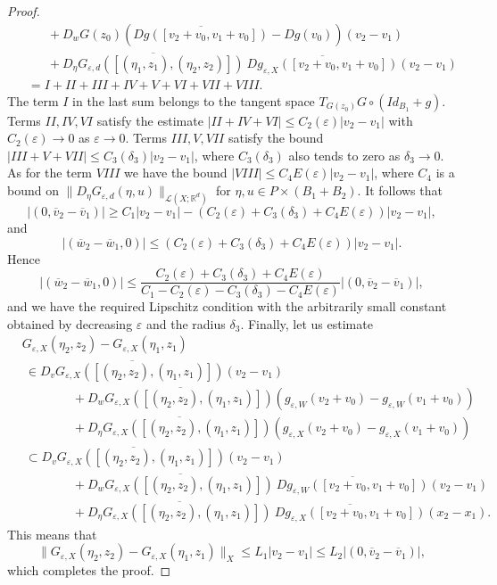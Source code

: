 \documentclass[11pt, leqno]{amsart}
\theoremstyle{definition}
\def\R{\mathbb{R}}
\begin{document}
\begin{proof}
\begin{align*}
	 				& \qquad +D_wG(z_0)\left(\overline{Dg([v_2+v_0,v_1+v_0])}-Dg(v_0)\right)(v_2-v_1)\\
	 				& \qquad  + \overline{D_\eta G_{\varepsilon,d}([(\eta_1,z_1),(\eta_2,z_2)])}\ \overline{D g_{\varepsilon,X}([v_2+v_0,v_1+v_0])} (v_2-v_1) \\
	 				& \ \ = I + II+III+IV+V+VI+VII+VIII.
	 			\end{align*}
	 			The  term $I$ in the last sum belongs to the tangent space $T_{G(z_0)}G\circ(Id_{B_1}+g)$. Terms $II, IV, VI$ satisfy the estimate $|II+IV+VI|\leq C_2(\varepsilon)|v_2-v_1|$ with $C_2(\varepsilon)\to 0$ as $\varepsilon\to 0$. Terms $III,V,VII$ satisfy the bound $|III+V+VII|\leq C_3(\delta_3)|v_2-v_1|$, where $C_3(\delta_3)$ also tends to zero as $\delta_3\to 0$. As for the term $VIII$ we have the bound $|VIII|\leq C_4 E(\varepsilon)|v_2-v_1|$, where $C_4$ is a bound on $\|D_\eta G_{\varepsilon,d}(\eta,u)\|_{\mathcal{L}(X;\R^d)}$ for $\eta,u\in P\times (B_1+B_2)$.
	 			It follows that
	 			$$
	 			|(0,\overline{v}_2-\overline{v}_1) | \geq C_1 |v_2-v_1| - (C_2(\varepsilon)+C_3(\delta_3)+C_4E(\varepsilon))|v_2-v_1|,
	 			$$
	 			and
	 			$$
	 			|(\overline{w}_2-\overline{w}_1,0) | \leq  (C_2(\varepsilon)+C_3(\delta_3)+C_4E(\varepsilon))|v_2-v_1|.
	 			$$
 Hence
	 			$$
	 			|(\overline{w}_2-\overline{w}_1,0) | \leq  \frac{C_2(\varepsilon)+C_3(\delta_3)+C_4E(\varepsilon)}{C_1-C_2(\varepsilon)-C_3(\delta_3)-C_4E(\varepsilon)}|(0,\overline{v}_2-\overline{v}_1) |,
	 			$$
	 			and we have the required Lipschitz condition with the arbitrarily small constant obtained by decreasing $\varepsilon$ and the radius $\delta_3$.
	 			Finally, let us estimate
	 			\begin{align*}
	 				& G_{\varepsilon,X}(\eta_2,z_2) - G_{\varepsilon,X}(\eta_1,z_1) \\
	 				& \ \in
	 				\overline{D_v G_{\varepsilon,X} ([(\eta_2,z_2),(\eta_1,z_1)])}(v_2-v_1)\\
	 				& \qquad \qquad + \overline{D_w G_{\varepsilon,X} ([(\eta_2,z_2),(\eta_1,z_1)])}(g_{\varepsilon,W}(v_2+v_0)-g_{\varepsilon,W}(v_1+v_0)) \\
	 				& \qquad \qquad  + \overline{D_\eta G_{\varepsilon,X} ([(\eta_2,z_2),(\eta_1,z_1)])}(g_{\varepsilon,X}(v_2+v_0)-g_{\varepsilon,X}(v_1+v_0))\\
	 				& \ \subset 
	 								\overline{D_v G_{\varepsilon,X} ([(\eta_2,z_2),(\eta_1,z_1)])}(v_2-v_1)\\
	 								& \qquad \qquad + \overline{D_w G_{\varepsilon,X} ([(\eta_2,z_2),(\eta_1,z_1)])}\ \overline{D g_{\varepsilon,W}([v_2+v_0,v_1+v_0])}(v_2-v_1)\\
	 				& \qquad \qquad  + \overline{D_\eta G_{\varepsilon,X} ([(\eta_2,z_2),(\eta_1,z_1)])}\ \overline{D g_{\varepsilon,X}([v_2+v_0,v_1+v_0])}(x_2-x_1).
	 			\end{align*}
	 			This means that
	 			$$
	 			\|G_{\varepsilon,X}(\eta_2,z_2) - G_{\varepsilon,X}(\eta_1,z_1)\|_X \leq L_1|v_2-v_1| \leq  L_2|(0,\overline{v}_2-\overline{v}_1) |,
	 			$$
	 			which completes the proof.
	 			
	 			\end{proof}
	 	
\end{document}
